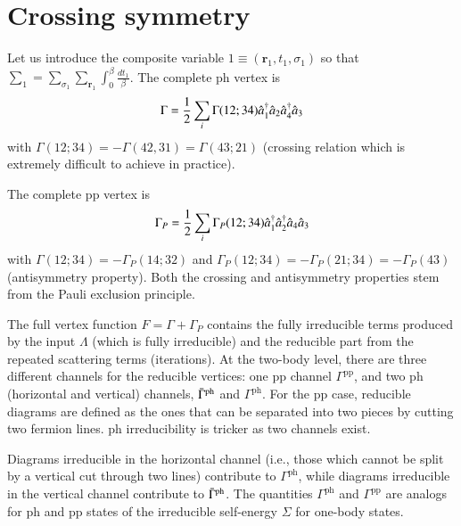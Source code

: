 \documentclass[aip,jcp,reprint,noshowkeys,superscriptaddress]{revtex4-1}
\newcommand{\cre}[1]{\Hat{a}_{#1}^{\dag}}
\newcommand{\ani}[1]{\Hat{a}_{#1}}
\newcommand{\br}{\boldsymbol{r}}
\newcommand{\ph}{\text{ph}}
\newcommand{\pp}{\text{pp}}
\begin{document}
\section{Crossing symmetry}

Let us introduce the composite variable $1 \equiv (\br_1,t_1,\sigma_1)$ so that $\sum_{1} = \sum_{\sigma_1} \sum_{\br_1} \int_0^\beta \frac{dt_1}{\beta}$.
The complete ph vertex is
\begin{equation}
	\Gamma = \frac{1}{2} \sum_i \Gamma(12;34) \cre{1} \ani{2} \cre{4} \ani{3}
\end{equation}
with $\Gamma(12;34) = - \Gamma(42,31) = \Gamma(43;21)$ (crossing relation which is extremely difficult to achieve in practice).

The complete pp vertex is 
\begin{equation}
	\Gamma_P = \frac{1}{2} \sum_i \Gamma_P(12;34) \cre{1} \cre{2} \ani{4} \ani{3}
\end{equation}
with $\Gamma(12;34) = - \Gamma_P(14;32)$ and $\Gamma_P(12;34) = - \Gamma_P(21;34) = - \Gamma_P(43)$ (antisymmetry property).
Both the crossing and antisymmetry properties stem from the Pauli exclusion principle.


The full vertex function $F = \Gamma + \Gamma_P$ contains the fully irreducible terms produced by the input $\Lambda$ (which is fully irreducible) and the reducible part from the repeated scattering terms (iterations). 
At the two-body level, there are three different channels for the reducible vertices: one pp channel $\Gamma^\pp$, and two ph (horizontal and vertical) channels, $\Bar{\Gamma}^\ph$ and $\Gamma^\ph$.
For the pp case, reducible diagrams are defined as the ones that can be separated into two pieces by cutting two fermion lines.
ph irreducibility is tricker as two channels exist.


Diagrams irreducible in the horizontal channel (i.e., those which cannot be split by a vertical cut through two lines) contribute to $\Gamma^\ph$, while diagrams irreducible in the vertical channel contribute to $\Bar{\Gamma}^\ph$. 
The quantities $\Gamma^\ph$ and $\Gamma^\pp$ are analogs for ph and pp states of the irreducible self-energy $\Sigma$ for one-body states.
\end{document}
